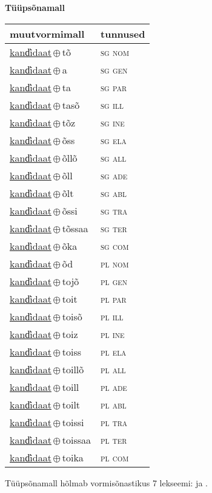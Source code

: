 

\vspace{3.5em}
\noindent \begin{minipage}{\textwidth}
\noindent \textbf{Tüüpsõnamall \,}\\

\begin{sideways}
\begin{tabular}{l l}
muutvormimall & tunnused \\
\hline
\underline{kand̕idaat}\,$\oplus$\,tõ & \textsc{ sg nom } \\
\underline{kand̕idaat}\,$\oplus$\,a & \textsc{ sg gen } \\
\underline{kand̕idaat}\,$\oplus$\,ta & \textsc{ sg par } \\
\underline{kand̕idaat}\,$\oplus$\,tasõ & \textsc{ sg ill } \\
\underline{kand̕idaat}\,$\oplus$\,tõz & \textsc{ sg ine } \\
\underline{kand̕idaat}\,$\oplus$\,õss & \textsc{ sg ela } \\
\underline{kand̕idaat}\,$\oplus$\,õllõ & \textsc{ sg all } \\
\underline{kand̕idaat}\,$\oplus$\,õll & \textsc{ sg ade } \\
\underline{kand̕idaat}\,$\oplus$\,õlt & \textsc{ sg abl } \\
\underline{kand̕idaat}\,$\oplus$\,õssi & \textsc{ sg tra } \\
\underline{kand̕idaat}\,$\oplus$\,tõssaa & \textsc{ sg ter } \\
\underline{kand̕idaat}\,$\oplus$\,õka & \textsc{ sg com } \\
\underline{kand̕idaat}\,$\oplus$\,õd & \textsc{ pl nom } \\
\underline{kand̕idaat}\,$\oplus$\,tojõ & \textsc{ pl gen } \\
\underline{kand̕idaat}\,$\oplus$\,toit & \textsc{ pl par } \\
\underline{kand̕idaat}\,$\oplus$\,toisõ & \textsc{ pl ill } \\
\underline{kand̕idaat}\,$\oplus$\,toiz & \textsc{ pl ine } \\
\underline{kand̕idaat}\,$\oplus$\,toiss & \textsc{ pl ela } \\
\underline{kand̕idaat}\,$\oplus$\,toillõ & \textsc{ pl all } \\
\underline{kand̕idaat}\,$\oplus$\,toill & \textsc{ pl ade } \\
\underline{kand̕idaat}\,$\oplus$\,toilt & \textsc{ pl abl } \\
\underline{kand̕idaat}\,$\oplus$\,toissi & \textsc{ pl tra } \\
\underline{kand̕idaat}\,$\oplus$\,toissaa & \textsc{ pl ter } \\
\underline{kand̕idaat}\,$\oplus$\,toika & \textsc{ pl com } \\
\end{tabular}
\end{sideways}
\label{tab:tüüpsõnamall-kand̕idaattõ}

\end{minipage}

 
\vspace{1em}
\noindent Tüüpsõnamall  hõlmab vormisõnastikus 7 lekseemi:  ja .
